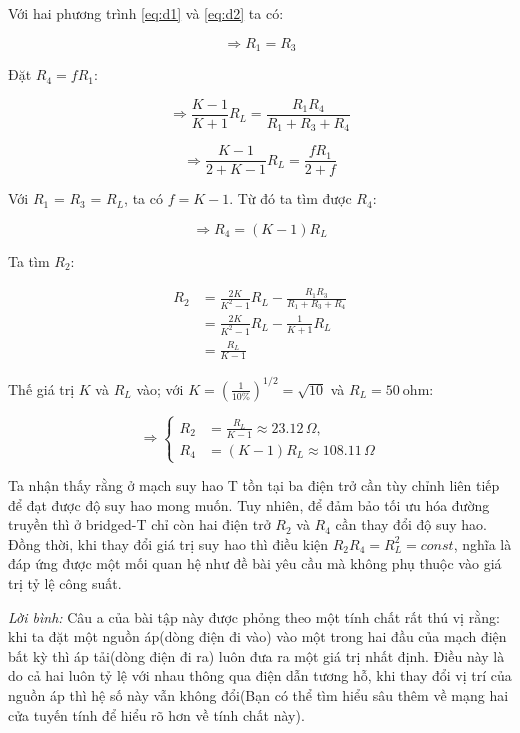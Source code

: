 Với hai phương trình \eqref{eq:d1} và \eqref{eq:d2} ta có:

\begin{equation}
\Rightarrow R_1=R_3
\end{equation}

Đặt $R_4=fR_1$:

\begin{equation}
\Rightarrow \frac{K-1}{K+1} R_L=\frac{R_1R_4}{R_1+R_3+R_4}
\end{equation}

\begin{equation}
\Rightarrow \frac{K-1}{2+K-1} R_L=\frac{fR_1}{2+f}
\end{equation}

Với $R_1$ = $R_3$ = $R_L$, ta có $f=K-1$. Từ đó ta tìm được $R_4$:

\begin{equation}
\Rightarrow R_4=(K-1)R_L
\end{equation}

Ta tìm $R_2$:

\begin{equation}
\begin{aligned}
R_2 &= \frac{2K}{K^2-1} R_L-\frac{R_1R_3}{R_1+R_3+R_4}
\\ &= \frac{2K}{K^2-1} R_L-\frac{1}{K+1} R_L
\\ &= \frac{R_L}{K-1}
\end{aligned}
\end{equation}

Thế giá trị $K$ và $R_L$ vào; với $K=\left(\frac{1}{10\%}\right)^{1/2}=\sqrt{10}$ và $R_L=50\ \mathrm{ohm}$:

\begin{equation*}
\Rightarrow \left\{
\begin{aligned}
R_2&=\frac{R_L} {K-1} \approx 23.12\,\Omega,\\
R_4&=(K-1) R_L \approx 108.11\,\Omega
\end{aligned}
\right. 
\end{equation*}

Ta nhận thấy rằng ở mạch suy hao T tồn tại ba điện trở cần tùy chỉnh liên tiếp để đạt được độ suy hao mong muốn. Tuy nhiên, để đảm bảo tối ưu hóa đường truyền thì ở bridged-T chỉ còn hai điện trở $R_2$ và $R_4$ cần thay đổi độ suy hao. Đồng thời, khi thay đổi giá trị suy hao thì điều kiện \textbf{$R_2R_4 = R_L^2 = {const}$}, nghĩa là đáp ứng được một mối quan hệ như đề bài yêu cầu mà không phụ thuộc vào giá trị tỷ lệ công suất.

\emph{Lời bình:} 
Câu a của bài tập này được phỏng theo một tính chất rất thú vị rằng: khi ta đặt một nguồn áp(dòng điện đi vào) vào một trong hai đầu của mạch điện bất kỳ thì áp tải(dòng điện đi ra) luôn đưa ra một giá trị nhất định. Điều này là do cả hai luôn tỷ lệ với nhau thông qua điện dẫn tương hỗ, khi thay đổi vị trí của nguồn áp thì hệ số này vẫn không đổi(Bạn có thể tìm hiểu sâu thêm về mạng hai cửa tuyến tính để hiểu rõ hơn về tính chất này).

